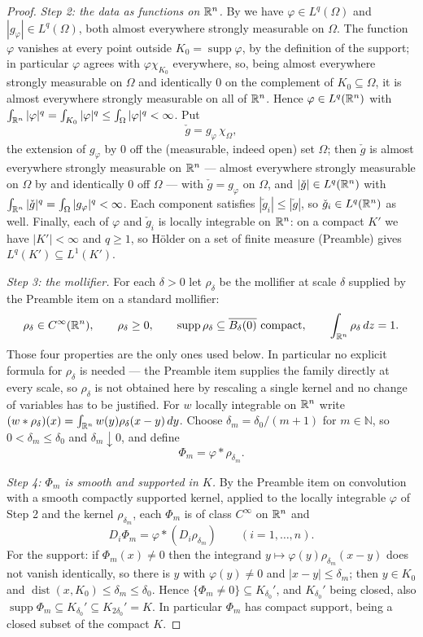 \begin{proof}
\emph{Step 2: the data as functions on $\mathbb{R}^n$.}  By  we have
$\varphi\in L^q(\Omega)$ and $|g_\varphi|\in L^q(\Omega)$, both almost
everywhere strongly measurable on $\Omega$.
The function $\varphi$ vanishes at every point outside
$K_0=\operatorname{supp}\varphi$, by the definition of the support; in
particular $\varphi$ agrees with $\varphi\chi_{K_0}$ everywhere, so, being
almost everywhere strongly measurable on $\Omega$ and identically $0$ on the
complement of $K_0\subseteq\Omega$, it is almost everywhere strongly measurable
on all of $\mathbb{R}^n$.  Hence $\varphi\in L^q(\mathbb{R}^n)$ with
$\int_{\mathbb{R}^n}|\varphi|^q=\int_{K_0}|\varphi|^q\le\int_\Omega|\varphi|^q<\infty$.
Put
\[
\check g=g_\varphi\,\chi_\Omega ,
\]
the extension of $g_\varphi$ by $0$ off the (measurable, indeed open) set
$\Omega$; then $\check g$ is almost everywhere strongly measurable on $\mathbb{R}^n$ ---
almost everywhere strongly measurable on $\Omega$ by  and
identically $0$ off $\Omega$ --- with $\check g=g_\varphi$ on
$\Omega$, and $|\check g|\in L^q(\mathbb{R}^n)$ with
$\int_{\mathbb{R}^n}|\check g|^q=\int_\Omega|g_\varphi|^q<\infty$.  Each component
satisfies $|\check g_i|\le|\check g|$, so $\check g_i\in L^q(\mathbb{R}^n)$ as well.
Finally, each of $\varphi$ and $\check g_i$ is locally integrable on $\mathbb{R}^n$: on
a compact $K'$ we have $|K'|<\infty$ and $q\ge1$, so H\"older on a set of finite
measure (Preamble) gives $L^q(K')\subseteq L^1(K')$.

\emph{Step 3: the mollifier.}  For each $\delta>0$ let $\rho_\delta$ be the mollifier at scale $\delta$
supplied by the Preamble item on a standard mollifier:
\[
\rho_\delta\in C^\infty(\R^n),\qquad \rho_\delta\ge0,\qquad
\operatorname{supp}\rho_\delta\subseteq\overline{B_\delta(0)}\ \text{compact},
\qquad \int_{\R^n}\rho_\delta\,dz=1 .
\]
Those four properties are the only ones used below.  In particular no explicit
formula for $\rho_\delta$ is needed --- the Preamble item supplies the family
directly at every scale, so $\rho_\delta$ is not obtained here by rescaling a
single kernel and no change of variables has to be justified.  For $w$ locally integrable on $\mathbb{R}^n$ write
$(w*\rho_\delta)(x)=\int_{\mathbb{R}^n}w(y)\rho_\delta(x-y)\,dy$.  Choose
$\delta_m=\delta_0/(m+1)$ for $m\in\mathbb{N}$, so $0<\delta_m\le\delta_0$ and
$\delta_m\downarrow0$, and define
\[
\Phi_m=\varphi*\rho_{\delta_m} .
\]

\emph{Step 4: $\Phi_m$ is smooth and supported in $K$.}  By the Preamble item on
convolution with a smooth compactly supported kernel, applied to the locally
integrable $\varphi$ of Step 2 and the kernel $\rho_{\delta_m}$, each $\Phi_m$
is of class $C^\infty$ on $\mathbb{R}^n$ and
\[
D_i\Phi_m=\varphi*(D_i\rho_{\delta_m})\qquad(i=1,\dots,n).
\tag{1}
\]
For the support: if $\Phi_m(x)\ne0$ then the integrand
$y\mapsto\varphi(y)\rho_{\delta_m}(x-y)$ does not vanish identically, so there
is $y$ with $\varphi(y)\ne0$ and $|x-y|\le\delta_m$; then $y\in K_0$ and
$\operatorname{dist}(x,K_0)\le\delta_m\le\delta_0$.  Hence
$\{\Phi_m\ne0\}\subseteq K_{\delta_0}'$, and $K_{\delta_0}'$ being closed, also
$\operatorname{supp}\Phi_m\subseteq K_{\delta_0}'\subseteq
K_{2\delta_0}'=K$.  In particular $\Phi_m$ has compact support, being a closed
subset of the compact $K$.


\end{proof}
